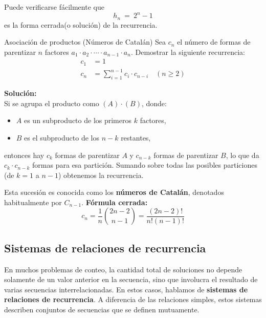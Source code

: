 Puede verificarse fácilmente que $$ h_n~=~2^n-1 $$ es la forma cerrada(o solución) de la recurrencia. 

\begin{exampleblock}{Asociación de productos (Números de Catalán)}
Sea $c_n$ el número de formas de parentizar $n$ factores $a_1 \cdot a_2 \cdot \cdots \cdot a_{n-1} \cdot a_n$. Demostrar la siguiente recurrencia:
\begin{align*}
c_1 &= 1 \\
c_n &= \sum_{i=1}^{n-1} c_i \cdot c_{n-i} \quad (n \geq 2)
\end{align*}
\end{exampleblock}
\noindent \textbf{Solución:}\\
Si se agrupa el producto como $(A) \cdot (B)$, donde:
\begin{itemize}
\item $A$ es un subproducto de los primeros $k$ factores,
\item $B$ es el subproducto de los $n-k$ restantes,
\end{itemize}
\noindent entonces hay $c_k$ formas de parentizar $A$ y $c_{n-k}$ formas de parentizar $B$, lo que da $c_k \cdot c_{n-k}$ formas para esa partición. Sumando sobre todas las posibles particiones (de $k = 1$ a $n-1$) obtenemos la recurrencia.

Esta sucesión es conocida como los \textbf{números de Catalán}, denotados habitualmente por $C_{n-1}$.
\textbf{Fórmula cerrada:}
\[
c_n = \frac{1}{n} \binom{2n - 2}{n - 1} = \frac{(2n - 2)!}{n!(n - 1)!}
\]

\subsection{Sistemas de relaciones de recurrencia}
En muchos problemas de conteo, la cantidad total de soluciones no depende solamente de un valor anterior en la secuencia, sino que involucra el resultado de varias secuencias interrelacionadas. En estos casos, hablamos de 	\textbf{sistemas de relaciones de recurrencia}. A diferencia de las relaciones simples, estos sistemas describen conjuntos de secuencias que se definen mutuamente.

